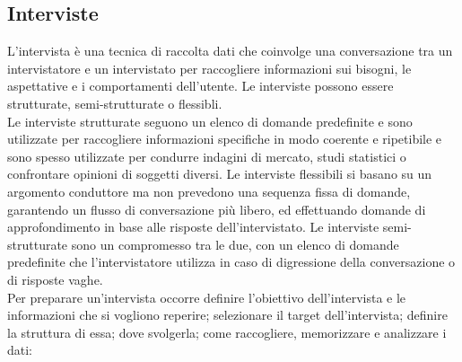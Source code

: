 \documentclass{report}
\begin{document}
	\subsection{Interviste}
	L'intervista è una tecnica di raccolta dati che coinvolge una conversazione tra un intervistatore e un intervistato per raccogliere informazioni sui bisogni, le aspettative e i comportamenti dell'utente. Le interviste possono essere strutturate, semi-strutturate o flessibli.
	\vspace{\baselineskip}\\
	Le interviste strutturate seguono un elenco di domande predefinite e sono utilizzate per raccogliere informazioni specifiche in modo coerente e ripetibile e sono spesso utilizzate per condurre indagini di mercato, studi statistici o confrontare opinioni di soggetti diversi. Le interviste flessibili si basano su un argomento conduttore ma non prevedono una sequenza fissa di domande, garantendo un flusso di conversazione più libero, ed effettuando domande di approfondimento in base alle risposte dell'intervistato. Le interviste semi-strutturate sono un compromesso tra le due, con un elenco di domande predefinite che l'intervistatore utilizza in caso di digressione della conversazione o di risposte vaghe.
	\vspace{\baselineskip}\\
	Per preparare un'intervista occorre definire l'obiettivo dell'intervista e le informazioni che si vogliono reperire; selezionare il target dell'intervista; definire la struttura di essa; dove svolgerla; come raccogliere, memorizzare e analizzare i dati:
\end{document}

